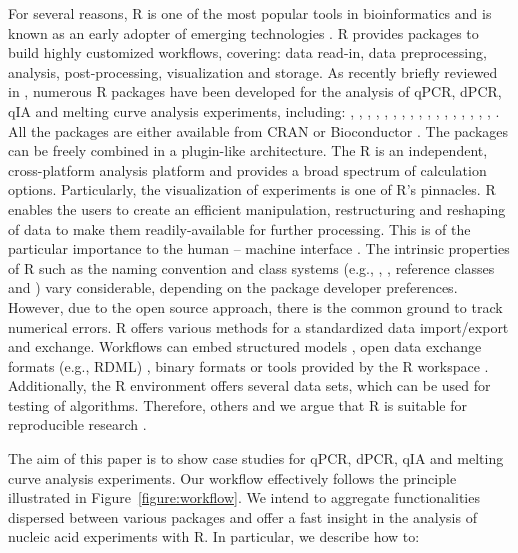 For several reasons, R is one of the most popular tools in bioinformatics and 
is 
known as an early adopter of emerging technologies \citep{pabinger_2014}. R 
provides packages to build highly customized workflows, covering: data 
read-in, data preprocessing, analysis, post-processing, visualization and 
storage. As recently briefly reviewed in \citet{pabinger_2014}, numerous R 
packages have been developed for the analysis of qPCR, dPCR, qIA and melting 
curve analysis experiments, including: , , 
, , , , 
, , , , 
, , , , 
, , , 
. All the packages are either available from CRAN or 
Bioconductor \citep{gentleman_2004}. The packages can be freely combined in a 
plugin-like architecture. The R is an independent, cross-platform analysis 
platform and 
provides a broad spectrum of calculation options. Particularly, the 
visualization of 
experiments is one of R's pinnacles. R enables the users to create an 
efficient manipulation, restructuring and reshaping of data to make them 
readily-available for further processing. This is of the particular importance 
to 
the human -- machine interface \citep{Oh_2014}. The intrinsic properties of R 
such as the naming convention \citep{Baaaath_2012} and class systems (e.g., 
, , reference classes and ) vary considerable, 
depending on the package developer preferences. However, due to the open source 
approach, there is the common ground to track numerical errors. R offers 
various 
methods for a standardized data import/export and exchange. Workflows can embed 
structured models \citet{Guazzelli_2009}, open data exchange formats (e.g., 
RDML) , binary 
formats \citep{michna_2013} or tools provided by the R workspace 
\citep{RDCT2010c}. Additionally, the R environment offers several data sets, 
which can be used for testing of algorithms. Therefore, others and we argue 
that 
R is suitable for reproducible research \citep{Murrell_2012, 
gandrud_2013, hofmann_2013, kuhn_cran_2014, Leeper_2014, liu_2014}. 

The aim of this paper is to show case studies for qPCR, dPCR, qIA and melting 
curve analysis experiments. Our workflow effectively follows the principle 
illustrated in Figure~\ref{figure:workflow}. We intend to aggregate 
functionalities dispersed between various packages and offer a fast insight in 
the analysis of nucleic acid experiments with R. In particular, we describe how 
to:


